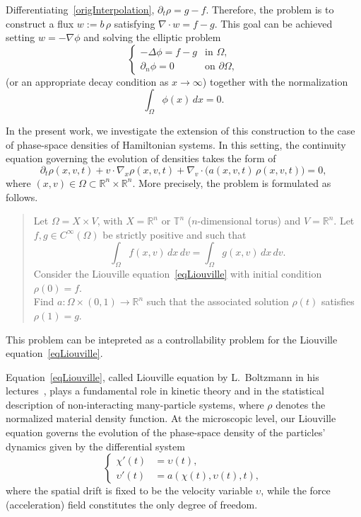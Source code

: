 \documentclass[11pt]{article}
\newcommand{\R}{{\mathbb R}}
\newcommand{\T}{{\mathbb T}}
\begin{document}
Differentiating~\eqref{origInterpolation}, $\partial_t\rho=g-f.$
Therefore, the problem is to construct a flux \(w:= b \, \rho \) satisfying 
$\nabla\cdot w=f-g$. This goal can be achieved setting $w=-\nabla\phi$ 
and solving the elliptic problem
\begin{equation}
\label{eq:moser_poisson}
\begin{cases}
-\Delta \phi=f - g & \text{in }\Omega,\\
\partial_n\phi=0 & \text{on }\partial\Omega,
\end{cases}
\end{equation}
(or an appropriate decay condition as $x \to \infty$) together with the normalization
\[
\int_{\Omega}\phi(x)\,dx=0.
\]


In the present work, we investigate the extension of 
this construction to the case of phase-space densities 
of 
Hamiltonian systems. In this setting, the continuity 
equation governing the evolution of densities takes the form of 
\begin{equation}\label{eqLiouville}
\partial_t \rho(x,v,t) + v\cdot\nabla_x \rho(x,v,t)  
+  \nabla_v \cdot \big( a(x,v,t) \, \rho(x,v,t)  \big)= 0, 
\end{equation}
where $(x,v)\in \Omega\subset \R^n\times\R^n$.
More precisely, the problem is formulated as follows. 
\begin{quotation}
\noindent Let $\Omega = X\times V$,
with $X=\R^n$ or $\T^n$ ($n$-dimensional torus) and $V = \R^n$. 
Let $f,g\in C^\infty(\Omega)$ be strictly positive and
such that
\[
\int_\Omega f(x,v) \,dx\,dv = \int_\Omega g(x,v) \,dx\,dv.
\]
Consider the Liouville equation~\eqref{eqLiouville} with initial condition $\rho(0)=f$. \\
Find $a:\Omega \times (0,1)    \to  \R^n$ such that the associated solution $\rho(t)$ 
satisfies $\rho(1)=g$. 
\end{quotation}
This problem can be intepreted as a controllability problem for the 
Liouville equation~\eqref{eqLiouville}. 



\medskip

Equation~\eqref{eqLiouville}, called Liouville equation by L.~Boltzmann in his 
lectures~\cite{boltzmann}, plays a fundamental role in kinetic theory and in the
statistical description of non-interacting many-particle systems, 
where $\rho$ denotes the normalized material density function. 
At the microscopic level, our Liouville equation governs the evolution 
of the phase-space density of the particles' dynamics given by the 
differential system 
\begin{equation}\label{eq:micro}
\begin{cases}
\chi'(t) &=\upsilon(t), \\ 
\upsilon'(t) &=a(\chi(t),\upsilon(t),t),
\end{cases}
\end{equation}
where the spatial drift is fixed to be the velocity variable $\upsilon$,
while the force (acceleration) field constitutes the only degree of freedom.
\end{document}
